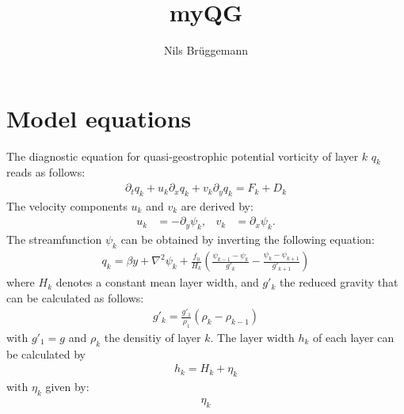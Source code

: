 \documentclass[a4paper,10pt]{article}
\title{myQG}
\author{Nils Br\"uggemann}
\newcommand{\px}{\partial_x}
\newcommand{\py}{\partial_y}
\begin{document}
\maketitle

\section{Model equations}
The diagnostic equation for quasi-geostrophic potential vorticity of layer $k$ $q_k$ reads as follows:
\begin{align}
 \partial_t q_k + u_k \partial_x q_k + v_k \partial_y q_k = F_k + D_k 
\end{align}
The velocity components $u_k$ and $v_k$ are derived by:
\begin{align}
 u_k &= - \py \psi_k,
&
 v_k &=   \px \psi_k.
\end{align}
The streamfunction $\psi_k$ can be obtained by inverting the following equation:
\begin{align}
 q_k = \beta y + \nabla^2 \psi_k + \frac{f_0}{H_k} \left( \frac{\psi_{k-1} - \psi_k}{g'_k} - \frac{\psi_k-\psi_{k+1}}{g'_{k+1}} \right)
\end{align}
where $H_k$ denotes a constant mean layer width, and $g'_{k}$ the reduced gravity that can be calculated as follows:
\begin{align}
 g'_k = \frac{g'_1}{\rho_1} ( \rho_k - \rho_{k-1} )
\end{align}
with $g'_1 = g$ and $\rho_k$ the densitiy of layer $k$.
The layer width $h_k$ of each layer can be calculated by
\begin{align}
 h_k = H_k + \eta_k
\end{align}
with $\eta_k$ given by:
\begin{align}
 \eta_k
\end{align}
\end{document}
